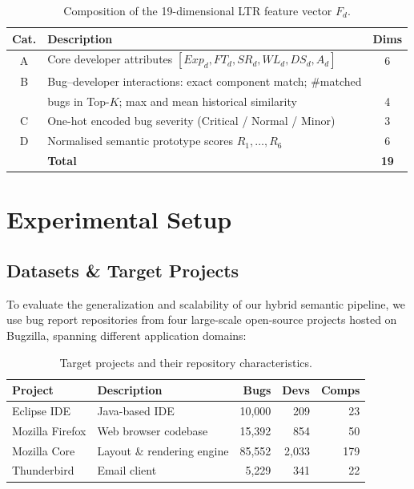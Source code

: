 \documentclass[sigconf,review,anonymous]{acmart}
\begin{document}
\begin{table}[H]
\centering
\caption{Composition of the 19-dimensional LTR feature vector $F_d$.}
\label{tab:ltrfeats}
\begin{tabular}{@{}clc@{}}
\toprule
\textbf{Cat.} & \textbf{Description} & \textbf{Dims} \\
\midrule
A & Core developer attributes $[\mathit{Exp}_d, FT_d, SR_d, WL_d, DS_d, A_d]$ & 6 \\
B & Bug--developer interactions: exact component match; \#matched & \\
  & bugs in Top-$K$; max and mean historical similarity  & 4 \\
C & One-hot encoded bug severity (Critical / Normal / Minor)       & 3 \\
D & Normalised semantic prototype scores $R_1,\ldots,R_6$          & 6 \\
\midrule
  & \textbf{Total}                                                  & \textbf{19} \\
\bottomrule
\end{tabular}
\end{table}


\section{Experimental Setup}

\subsection{Datasets \& Target Projects}

To evaluate the generalization and scalability of our hybrid semantic pipeline, we use bug report repositories from four large-scale open-source projects hosted on Bugzilla, spanning different application domains:

\begin{table}[h]
\centering
\small
\caption{Target projects and their repository characteristics.}
\label{tab:projects}
\renewcommand{\arraystretch}{1.2}
\begin{tabular}{@{}lp{2.8cm}rrr@{}}
\toprule
\textbf{Project} & \textbf{Description} & \textbf{Bugs} & \textbf{Devs} & \textbf{Comps} \\
\midrule
Eclipse IDE     & Java-based IDE                  & 10,000 & 209   & 23  \\
Mozilla Firefox & Web browser codebase            & 15,392 & 854   & 50  \\
Mozilla Core    & Layout \& rendering engine      & 85,552 & 2,033 & 179 \\
Thunderbird     & Email client                    & 5,229  & 341   & 22  \\
\bottomrule
\end{tabular}
\end{table}
\end{document}
